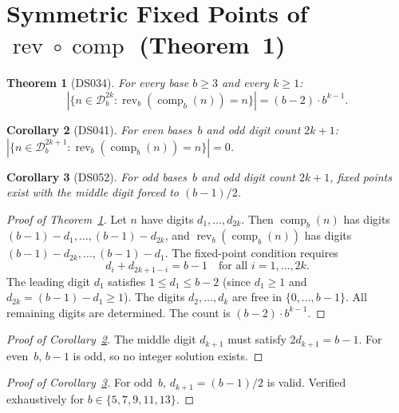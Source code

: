 \documentclass[11pt,a4paper]{amsart}
\theoremstyle{plain}
\newtheorem{theorem}{Theorem}
\newtheorem{corollary}[theorem]{Corollary}
\theoremstyle{definition}
\theoremstyle{remark}
\DeclareMathOperator{\rev}{rev}
\DeclareMathOperator{\comp}{comp}
\begin{document}
\section{Symmetric Fixed Points of $\rev \circ \comp$ (Theorem~1)}
\label{sec:symmetric}

\begin{theorem}[DS034]\label{thm:symmetric}
For every base $b \geq 3$ and every $k \geq 1$:
\[
|\{n \in \mathcal{D}_b^{2k} : \rev_b(\comp_b(n)) = n\}| = (b-2) \cdot b^{k-1}.
\]
\end{theorem}

\begin{corollary}[DS041]\label{cor:odd-even}
For even bases~$b$ and odd digit count $2k{+}1$:
$|\{n \in \mathcal{D}_b^{2k+1} : \rev_b(\comp_b(n)) = n\}| = 0$.
\end{corollary}

\begin{corollary}[DS052]\label{cor:odd-odd}
For odd bases~$b$ and odd digit count $2k{+}1$, fixed points exist with
the middle digit forced to $(b{-}1)/2$.
\end{corollary}

\begin{proof}[Proof of Theorem~\ref{thm:symmetric}]
Let $n$ have digits $d_1, \ldots, d_{2k}$. Then $\comp_b(n)$ has digits
$(b{-}1){-}d_1, \ldots, (b{-}1){-}d_{2k}$, and $\rev_b(\comp_b(n))$ has
digits $(b{-}1){-}d_{2k}, \ldots, (b{-}1){-}d_1$. The fixed-point condition
requires
\[
d_i + d_{2k+1-i} = b-1 \quad \text{for all } i = 1, \ldots, 2k.
\]
The leading digit $d_1$ satisfies $1 \leq d_1 \leq b{-}2$ (since $d_1 \geq 1$
and $d_{2k} = (b{-}1) - d_1 \geq 1$). The digits $d_2, \ldots, d_k$ are free
in $\{0, \ldots, b{-}1\}$. All remaining digits are determined. The count is
$(b{-}2) \cdot b^{k-1}$.
\end{proof}

\begin{proof}[Proof of Corollary~\ref{cor:odd-even}]
The middle digit $d_{k+1}$ must satisfy $2d_{k+1} = b{-}1$. For even~$b$,
$b{-}1$ is odd, so no integer solution exists.
\end{proof}

\begin{proof}[Proof of Corollary~\ref{cor:odd-odd}]
For odd~$b$, $d_{k+1} = (b{-}1)/2$ is valid. Verified exhaustively for
$b \in \{5, 7, 9, 11, 13\}$.
\end{proof}
\end{document}
